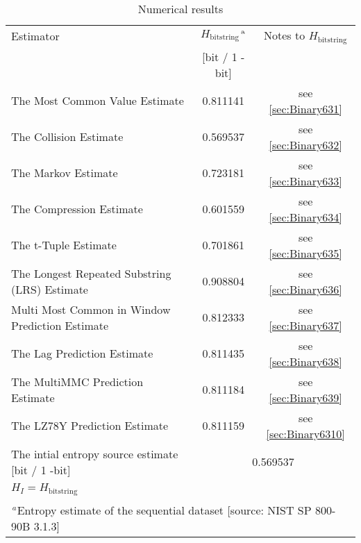 \documentclass[a3paper,xelatex,english]{bxjsarticle}
\begin{document}
\begin{table}[h]
\caption{Numerical results}
\begin{center}
\begin{tabular}{|l|c|c|}
\hline 
\rowcolor{anotherlightblue} %
Estimator										& $H_{\textrm{bitstring}}$$^{\textrm{\,a}}$ & Notes to $H_{\textrm{bitstring}}$	\\ 
\cline{2-3}
\rowcolor{anotherlightblue} %
\,												& [bit / 1 - bit]		\\
\hline 
The Most Common Value Estimate					& 0.811141& see \ref{sec:Binary631} \\
\hline 
The Collision Estimate							& 0.569537& see \ref{sec:Binary632} \\
\hline 
The Markov Estimate								& 0.723181& see \ref{sec:Binary633} \\
\hline 
The Compression Estimate						& 0.601559& see \ref{sec:Binary634} \\
\hline 
The t-Tuple Estimate							& 0.701861& see \ref{sec:Binary635} \\
\hline 
The Longest Repeated Substring (LRS) Estimate	& 0.908804& see \ref{sec:Binary636} \\
\hline 
Multi Most Common in Window Prediction Estimate	& 0.812333& see \ref{sec:Binary637} \\
\hline 
The Lag Prediction Estimate						& 0.811435& see \ref{sec:Binary638} \\
\hline 
The MultiMMC Prediction Estimate				& 0.811184& see \ref{sec:Binary639} \\
\hline 
The LZ78Y Prediction Estimate					& 0.811159& see \ref{sec:Binary6310} \\
\hline \hline 
The intial entropy source estimate [bit / 1 -bit]	& \multicolumn{2}{|c|}{0.569537}	\\
$H_{I} = H_{\textrm{bitstring}}$ & \multicolumn{2}{|c|}{ \, } 	\\
\hline \hline 
\multicolumn{3}{|l|}{$^{\,a}$\quad Entropy estimate of the sequential dataset [source: NIST SP 800-90B \cite{SP80090B} 3.1.3]} \\
\hline 
\end{tabular}
\end{center}
\end{table}
\end{document}
